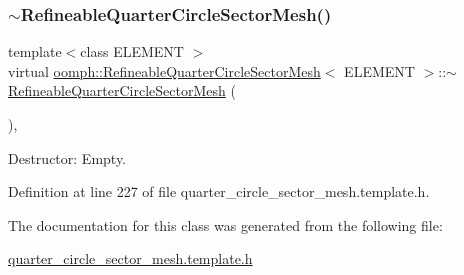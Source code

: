 \subsubsection{\texorpdfstring{$\sim$\+Refineable\+Quarter\+Circle\+Sector\+Mesh()}{~RefineableQuarterCircleSectorMesh()}}
{\footnotesize\ttfamily template$<$class E\+L\+E\+M\+E\+NT $>$ \\
virtual \hyperlink{classoomph_1_1RefineableQuarterCircleSectorMesh}{oomph\+::\+Refineable\+Quarter\+Circle\+Sector\+Mesh}$<$ E\+L\+E\+M\+E\+NT $>$\+::$\sim$\hyperlink{classoomph_1_1RefineableQuarterCircleSectorMesh}{Refineable\+Quarter\+Circle\+Sector\+Mesh} (\begin{DoxyParamCaption}{ }\end{DoxyParamCaption})\hspace{0.3cm}{\ttfamily [inline]}, {\ttfamily [virtual]}}



Destructor\+: Empty. 



Definition at line 227 of file quarter\+\_\+circle\+\_\+sector\+\_\+mesh.\+template.\+h.



The documentation for this class was generated from the following file\+:\begin{DoxyCompactItemize}
\item 
\hyperlink{quarter__circle__sector__mesh_8template_8h}{quarter\+\_\+circle\+\_\+sector\+\_\+mesh.\+template.\+h}\end{DoxyCompactItemize}
